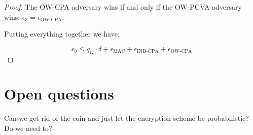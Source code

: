 \documentclass{article}
\begin{document}
\begin{proof}
    The OW-CPA adversary wins if and only if the OW-PCVA adversary wins: $\epsilon_3 = \epsilon_\text{OW-CPA}$.

    Putting everything together we have:

    \begin{equation*}
        \epsilon_0 
        \leq q_G \cdot \delta 
        + \epsilon_\text{MAC} 
        + \epsilon_\text{IND-CPA} 
        + \epsilon_\text{OW-CPA}
    \end{equation*}
\end{proof}

\section{Open questions}
Can we get rid of the coin and just let the encryption scheme be probabilistic? Do we need to?
\end{document}

